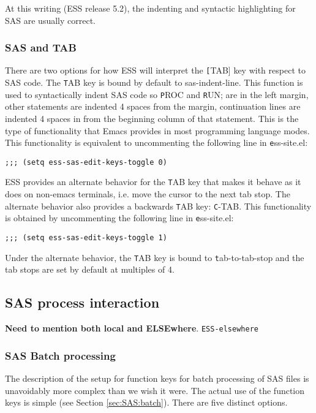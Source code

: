 \documentclass{article}
\begin{document}
At this writing (ESS release 5.2), the indenting and syntactic
highlighting for SAS are usually correct.


\subsubsection{SAS and TAB}
\label{sec:SAS:tab}

There are two options for how ESS will interpret the {\texttt [TAB]} key
with respect to SAS code.  The {\texttt TAB} key is bound by default to
sas-indent-line.  This function is used to syntactically indent SAS
code so {\texttt PROC} and {\texttt RUN;} are in the left margin, other
statements are indented 4 spaces from the margin, continuation lines
are indented 4 spaces in from the beginning column of that statement.
This is the type of functionality that Emacs provides in most
programming language modes.  This functionality is equivalent to
uncommenting the following line in {\texttt ess-site.el}:
\begin{verbatim}
;;; (setq ess-sas-edit-keys-toggle 0)
\end{verbatim}

ESS provides an alternate behavior for the {\texttt TAB} key that makes it
behave as it does on non-emacs terminals, i.e. move the cursor to the
next tab stop.  The alternate behavior also provides a backwards {\texttt
  TAB} key: {\texttt C-TAB}.  This functionality is obtained by
uncommenting the following line in {\texttt ess-site.el}:
\begin{verbatim}
;;; (setq ess-sas-edit-keys-toggle 1)
\end{verbatim}
Under the alternate behavior, the {\texttt TAB} key is bound to {\texttt
  tab-to-tab-stop} and the tab stops are set by default at multiples
of 4.

\subsection{SAS process interaction}
\label{sec:SAS:proc}

\textbf{Need to mention both local and ELSEwhere}.  \texttt{ESS-elsewhere}

\subsubsection{SAS Batch processing}
\label{sec:SAS:proc:batch}

The description of the setup for function keys for batch processing of
SAS files is unavoidably more complex than we wish it were.  The actual
use of the function keys is simple (see Section \ref{sec:SAS:batch}).
There are five distinct options.
\end{document}
